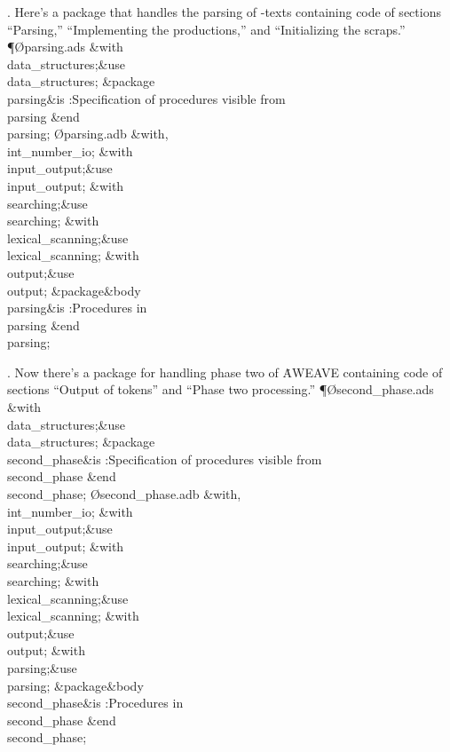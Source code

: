 \*. Here's a package that handles the parsing of \ADA-texts containing code
of sections ``Parsing,'' ``Implementing the productions,'' and
``Initializing the scraps.''
\Y\P\O{parsing.ads}\?\6
\?\&{with}\8\\{data\_structures};\8\&{use}\8\\{data\_structures};\6
\&{package}\8\1\\{parsing}\2\8\&{is}\8\1\6
:Specification of procedures visible from \\{parsing}\X\2\6
\&{end}\8\\{parsing};\7
\O{parsing.adb}\?\6
\?\&{with}\8\?,\?\\{int\_number\_io};\6
\&{with}\8\\{input\_output};\8\&{use}\8\\{input\_output};\6
\&{with}\8\\{searching};\8\&{use}\8\\{searching};\6
\&{with}\8\\{lexical\_scanning};\8\&{use}\8\\{lexical\_scanning};\6
\&{with}\8\\{output};\8\&{use}\8\\{output};\6
\&{package}\8\1\&{body}\8\\{parsing}\2\8\&{is}\8\1\6
:Procedures in \\{parsing}\X\2\6
\&{end}\8\\{parsing};\par
\fi

\*. Now there's a package for handling phase two of \.{AWEAVE} containing
code of sections ``Output of tokens'' and ``Phase two processing.''
\Y\P\O{second\_phase.ads}\?\6
\?\&{with}\8\\{data\_structures};\8\&{use}\8\\{data\_structures};\6
\&{package}\8\1\\{second\_phase}\2\8\&{is}\8\1\6
:Specification of procedures visible from \\{second\_phase}\X\2\6
\&{end}\8\\{second\_phase};\7
\O{second\_phase.adb}\?\6
\?\&{with}\8\?,\?\\{int\_number\_io};\6
\&{with}\8\\{input\_output};\8\&{use}\8\\{input\_output};\6
\&{with}\8\\{searching};\8\&{use}\8\\{searching};\6
\&{with}\8\\{lexical\_scanning};\8\&{use}\8\\{lexical\_scanning};\6
\&{with}\8\\{output};\8\&{use}\8\\{output};\6
\&{with}\8\\{parsing};\8\&{use}\8\\{parsing};\6
\&{package}\8\1\&{body}\8\\{second\_phase}\2\8\&{is}\8\1\6
:Procedures in \\{second\_phase}\X\2\6
\&{end}\8\\{second\_phase};\par
\fi

